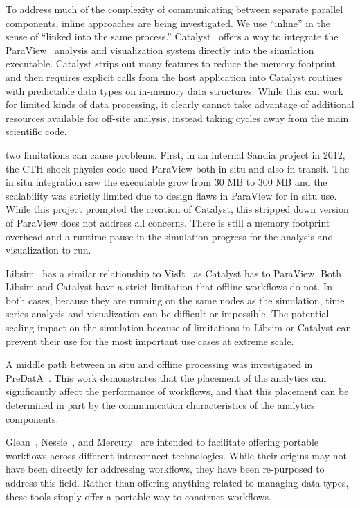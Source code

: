 To address much of the complexity of communicating between separate parallel
components, inline approaches are being investigated.
We use ``inline'' in the sense of ``linked into the same process.''
Catalyst~\cite{karimabadi:2013:catalyst} offers a way to integrate the
ParaView~\cite{Moreland:2008:paraview} analysis and visualization system
directly into the simulation executable. Catalyst strips out many features to
reduce the memory footprint and then requires explicit calls from the host
application into Catalyst routines with predictable data types on in-memory
data structures. While this can work for limited kinds of data processing,
it clearly cannot take advantage of additional resources
available for off-site analysis, instead taking cycles
away from the main scientific code.

two
limitations can cause problems. First, in an internal Sandia project in 2012,
the CTH shock physics code used ParaView both in situ and also in transit. The
in situ integration saw the executable grow from 30 MB to 300 MB and the
scalability was strictly limited due to design flaws in ParaView for in situ
use. While this project prompted the creation of Catalyst, this stripped down
version of ParaView does not address all concerns. There is still a memory
footprint overhead and a runtime pause in the simulation progress for the
analysis and visualization to run.
\fi

Libsim~\cite{whitlock:2011:libsim} has a similar relationship to
VisIt~\cite{Riedel:2007:visit} as Catalyst has to ParaView. Both Libsim and
Catalyst have a strict limitation that offline workflows do not. In both cases,
because they are running on the same nodes as the simulation, time series
analysis and visualization can be difficult or impossible. The potential
scaling impact on the simulation because of limitations in Libsim or Catalyst
can prevent their use for the most important use cases at extreme scale.

A middle path between in situ and offline processing was investigated in
PreDatA~\cite{zheng:2010:predata}.
This work demonstrates that the placement of the analytics can significantly
affect the performance of workflows, and that this placement can be determined
in part by the communication characteristics of the analytics components.

Glean~\cite{vishwanath:2011:glean}, Nessie~\cite{oldfield:lwfs-data-movement},
and Mercury~\cite{Soumagne:2013:mercury} are intended to facilitate offering
portable workflows across different interconnect technologies. While their
origins may not have been directly for addressing workflows, they have been
re-purposed to address this field. Rather than offering anything related to
managing data types, these tools simply offer a portable way to construct
workflows.
\fi


